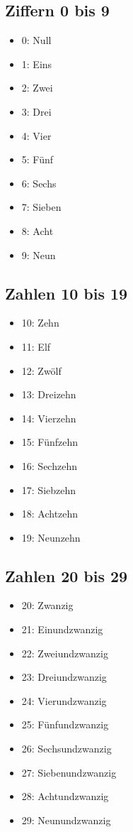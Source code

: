 \documentclass[a4paper]{article}
\begin{document}
\subsection{Ziffern 0 bis 9}
\begin{itemize}[nosep]
	\item 0: Null
	\item 1: Eins
	\item 2: Zwei
	\item 3: Drei
	\item 4: Vier
	\item 5: F\"unf
	\item 6: Sechs
	\item 7: Sieben
	\item 8: Acht
	\item 9: Neun
\end{itemize}

\subsection{Zahlen 10 bis 19}
\begin{itemize}[nosep]
	\item 10: Zehn
	\item 11: Elf
	\item 12: Zw\"olf
	\item 13: Dreizehn
	\item 14: Vierzehn
	\item 15: F\"unfzehn
	\item 16: Sechzehn
	\item 17: Siebzehn
	\item 18: Achtzehn
	\item 19: Neunzehn
\end{itemize}

\subsection{Zahlen 20 bis 29}
\begin{itemize}[nosep]
	\item 20: Zwanzig
	\item 21: Einundzwanzig
	\item 22: Zweiundzwanzig
	\item 23: Dreiundzwanzig
	\item 24: Vierundzwanzig
	\item 25: F\"unfundzwanzig
	\item 26: Sechsundzwanzig
	\item 27: Siebenundzwanzig
	\item 28: Achtundzwanzig
	\item 29: Neunundzwanzig
\end{itemize}
\end{document}
